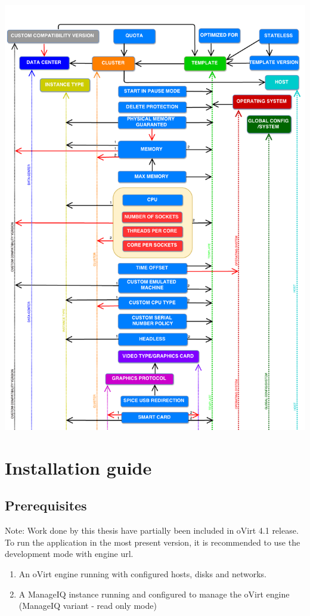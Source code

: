 \includegraphics[page=3, width=1.05\textwidth, angle=0]{DependencyGraph}

\chapter{Installation guide} \label{install}

\section{Prerequisites}
Note: Work done by this thesis have partially been included in oVirt 4.1 release. To run the application in the most present version, it is recommended to use the development mode with engine url. 

\begin{enumerate}
\item An oVirt engine running with configured hosts, disks and networks.  
\item A ManageIQ instance running and configured to manage the oVirt engine (ManageIQ variant - read only mode)
\end{enumerate} 

